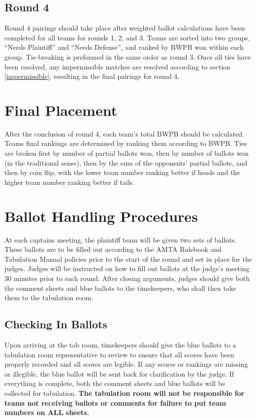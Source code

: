 \documentclass{article}
\begin{document}
\subsection{Round 4}
Round 4 pairings should take place after weighted ballot calculations have been completed for all teams for rounds 1, 2, and 3.  Teams are sorted into two groups, ``Needs Plaintiff'' and ``Needs Defense'', and ranked by BWPB won within each group.  Tie-breaking is preformed in the same order as round 3.  Once all ties have been resolved, any impermissible matches are resolved according to section \ref{impermissible}, resulting in the final pairings for round 4.
\section{Final Placement}
After the conclusion of round 4, each team's total BWPB should be calculated.  Teams final rankings are determined by ranking them according to BWPB.  Ties are broken first by number of partial ballots won, then by number of ballots won (in the traditional sense), then by the sum of the opponents' partial ballots,%
 and then by coin flip, with the lower team number ranking better if heads and the higher team number ranking better if tails.
\section{Ballot Handling Procedures}
At each captains meeting, the plaintiff team will be given two sets of ballots.  These ballots are to be filled out according to the AMTA Rulebook and Tabulation Manual policies prior to the start of the round and set in place for the judges.  Judges will be instructed on how to fill out ballots at the judge's meeting 30 minutes prior to each round.  After closing arguments, judges should give both the comment sheets and blue ballots to the timekeepers, who shall then take them to the tabulation room.
\subsection{Checking In Ballots}
Upon arriving at the tab room, timekeepers should give the blue ballots to a tabulation room representative to review to ensure that all scores have been properly recorded and all scores are legible.  If any scores or rankings are missing or illegible, the blue ballot will be sent back for clarification by the judge.  If everything is complete, both the comment sheets and blue ballots will be collected for tabulation.  \textbf{The tabulation room will not be responsible for teams not receiving ballots or comments for failure to put team numbers on ALL sheets.}
\end{document}
